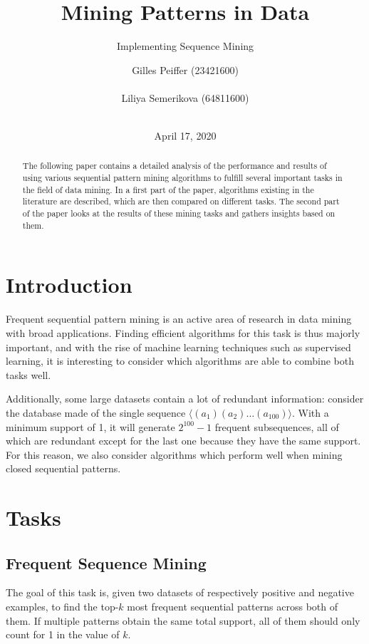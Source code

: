 \documentclass{sigkddExp}
\title{Mining Patterns in Data}
\subtitle{Implementing Sequence Mining}
\author{
\alignauthor Gilles Peiffer (23421600)\\
	\affaddr{Université catholique de Louvain}\\
	\email{gilles.peiffer@student.uclouvain.be}
\alignauthor Liliya Semerikova (64811600)\\
	\affaddr{Université catholique de Louvain}\\
	\email{liliya.semerikova@student.uclouvain.be}}
\date{April 17, 2020}
\begin{document}
\maketitle

\begin{abstract}
	The following paper contains a detailed analysis of the performance and results of using various sequential pattern mining algorithms to fulfill several important tasks in the field of data mining.
	In a first part of the paper, algorithms existing in the literature are described, which are then compared on different tasks.
	The second part of the paper looks at the results of these mining tasks and gathers insights based on them.
\end{abstract}

\section{Introduction}
Frequent sequential pattern mining is an active area of research in data mining with broad applications.
Finding efficient algorithms for this task is thus majorly important, and with the rise of machine learning techniques such as supervised learning, it is interesting to consider which algorithms are able to combine both tasks well.

Additionally, some large datasets contain a lot of redundant information: consider the database made of the single sequence \(\langle (a_1)(a_2) \dots (a_{100}) \rangle\).
With a minimum support of 1, it will generate \(2^{100} - 1\) frequent subsequences, all of which are redundant except for the last one because they have the same support.
For this reason, we also consider algorithms which perform well when mining closed sequential patterns.

\section{Tasks}
\label{sec:tasks}
\subsection{Frequent Sequence Mining}
\label{sec:fsm}
The goal of this task is, given two datasets of respectively positive and negative examples, to find the top-\(k\) most frequent sequential patterns across both of them.
If multiple patterns obtain the same total support, all of them should only count for 1 in the value of \(k\).
\end{document}
